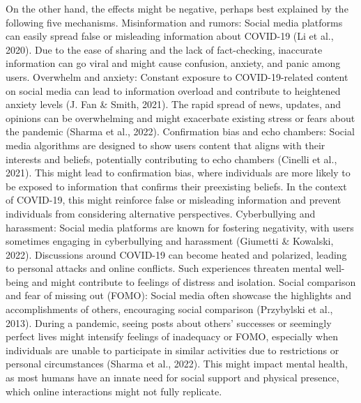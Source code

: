 \documentclass[
  man,mask,floatsintext]{apa7}
\begin{document}
On the other hand, the effects might be negative, perhaps best explained by the following five mechanisms.
Misinformation and rumors:
Social media platforms can easily spread false or misleading information about COVID-19 (Li et al., 2020).
Due to the ease of sharing and the lack of fact-checking, inaccurate information can go viral and might cause confusion, anxiety, and panic among users.
Overwhelm and anxiety:
Constant exposure to COVID-19-related content on social media can lead to information overload and contribute to heightened anxiety levels (J. Fan \& Smith, 2021).
The rapid spread of news, updates, and opinions can be overwhelming and might exacerbate existing stress or fears about the pandemic (Sharma et al., 2022).
Confirmation bias and echo chambers:
Social media algorithms are designed to show users content that aligns with their interests and beliefs, potentially contributing to echo chambers (Cinelli et al., 2021).
This might lead to confirmation bias, where individuals are more likely to be exposed to information that confirms their preexisting beliefs.
In the context of COVID-19, this might reinforce false or misleading information and prevent individuals from considering alternative perspectives.
Cyberbullying and harassment:
Social media platforms are known for fostering negativity, with users sometimes engaging in cyberbullying and harassment (Giumetti \& Kowalski, 2022).
Discussions around COVID-19 can become heated and polarized, leading to personal attacks and online conflicts.
Such experiences threaten mental well-being and might contribute to feelings of distress and isolation.
Social comparison and fear of missing out (FOMO):
Social media often showcase the highlights and accomplishments of others, encouraging social comparison (Przybylski et al., 2013).
During a pandemic, seeing posts about others' successes or seemingly perfect lives might intensify feelings of inadequacy or FOMO, especially when individuals are unable to participate in similar activities due to restrictions or personal circumstances (Sharma et al., 2022).
This might impact mental health, as most humans have an innate need for social support and physical presence, which online interactions might not fully replicate.
\end{document}
